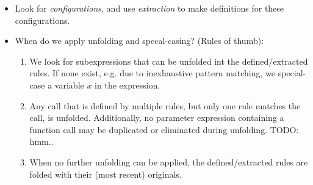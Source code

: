 \begin{itemize}

\item Look for \emph{configurations}, and use \emph{extraction} to make
definitions for these configurations.


\item When do we apply unfolding and specal-casing? (Rules of thumb):

\begin{enumerate}

\item We look for subexpressions that can be unfolded int the defined/extracted
rules. If none exist, e.g. due to inexhaustive pattern matching, we
special-case a variable $x$ in the expression.

\item Any call that is defined by multiple rules, but only one rule matches the
call, is unfolded. Additionally, no parameter expression containing a function
call may be duplicated or eliminated during unfolding. TODO: hmm..

\item When no further unfolding can be applied, the defined/extracted rules are
folded with their (most recent) originals.


\end{enumerate}
\end{itemize}
